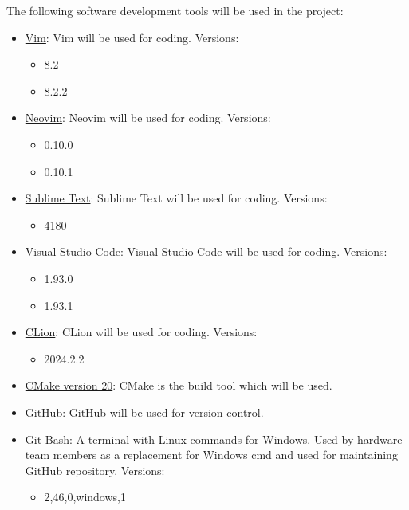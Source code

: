 The following software development tools will be used in the project:
\begin{itemize}
    \item \href{https://www.vim.org/vim-8.2-released.php}{Vim}: Vim will be used for coding. Versions:
    \begin{itemize}
        \item 8.2
        \item 8.2.2
    \end{itemize}
    \item \href{https://neovim.io/}{Neovim}: Neovim will be used for coding. Versions:
    \begin{itemize}
        \item 0.10.0
        \item 0.10.1
    \end{itemize}
    \item \href{https://www.sublimetext.com/}{Sublime Text}: Sublime Text will be used for coding. Versions:
    \begin{itemize}
        \item 4180
    \end{itemize}
    \item \href{https://code.visualstudio.com/}{Visual Studio Code}: Visual Studio Code will be used for coding. Versions:
    \begin{itemize}
        \item 1.93.0
        \item 1.93.1
    \end{itemize}
    \item \href{https://www.jetbrains.com/clion/}{CLion}: CLion will be used for coding. Versions:
    \begin{itemize}
        \item 2024.2.2
    \end{itemize}
    \item \href{https://cmake.org/}{CMake version 20}: CMake is the build tool which will be used.
    \item \href{https://github.com/}{GitHub}: GitHub will be used for version control.
    \item \href{https://gitforwindows.org/}{Git Bash}: A terminal with Linux commands for Windows. Used by hardware team members as a replacement for Windows cmd and used for maintaining GitHub repository. Versions:
    \begin{itemize}
        \item 2,46,0,windows,1
    \end{itemize}
\end{itemize}


